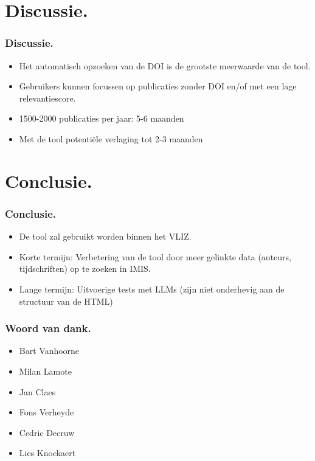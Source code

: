 \documentclass[aspectratio=169]{beamer}
\begin{document}
\begin{frame}
\begin{columns}[c]
\begin{column}{.5\textwidth}
\begin{table}
                
            \end{table}
        \end{column}
    \end{columns}
    
\end{frame}

\section{Discussie.}

\begin{frame}
\frametitle{Discussie.}
\begin{itemize}
    \item Het automatisch opzoeken van de DOI is de grootste meerwaarde van de tool.
    \item Gebruikers kunnen focussen op publicaties zonder DOI en/of met een lage relevantiescore.
    \item 1500-2000 publicaties per jaar: 5-6 maanden
    \item Met de tool potentiële verlaging tot 2-3 maanden
    \end{itemize}


\end{frame}

\section{Conclusie.}

\begin{frame}
\frametitle{Conclusie.}
\begin{itemize}
    \item De tool zal gebruikt worden binnen het VLIZ.
    \item Korte termijn: Verbetering van de tool door meer gelinkte data (auteurs, tijdschriften) op te zoeken in IMIS.
    \item Lange termijn: Uitvoerige tests met LLMs (zijn niet onderhevig aan de structuur van de HTML)
\end{itemize}

\end{frame}

\begin{frame}
    \frametitle{Woord van dank.}
    \begin{itemize}
        \item Bart Vanhoorne
        \item Milan Lamote
        \item Jan Claes
        \item Fons Verheyde
        \item Cedric Decruw
        \item Lies Knockaert
    \end{itemize}
    
\end{frame}
\end{document}
